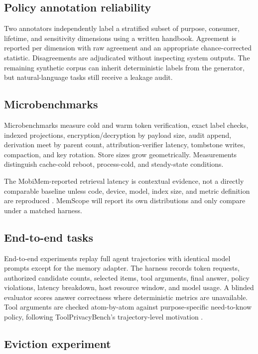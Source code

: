 \subsection{Policy annotation reliability}

Two annotators independently label a stratified subset of purpose, consumer, lifetime, and sensitivity dimensions using a written handbook. Agreement is reported per dimension with raw agreement and an appropriate chance-corrected statistic. Disagreements are adjudicated without inspecting system outputs. The remaining synthetic corpus can inherit deterministic labels from the generator, but natural-language tasks still receive a leakage audit.

\subsection{Microbenchmarks}

Microbenchmarks measure cold and warm token verification, exact label checks, indexed projections, encryption/decryption by payload size, audit append, derivation meet by parent count, attribution-verifier latency, tombstone writes, compaction, and key rotation. Store sizes grow geometrically. Measurements distinguish cache-cold reboot, process-cold, and steady-state conditions.

The MobiMem-reported retrieval latency is contextual evidence, not a directly comparable baseline unless code, device, model, index size, and metric definition are reproduced \citep{liu2025mobimem}. MemScope will report its own distributions and only compare under a matched harness.

\subsection{End-to-end tasks}

End-to-end experiments replay full agent trajectories with identical model prompts except for the memory adapter. The harness records token requests, authorized candidate counts, selected items, tool arguments, final answer, policy violations, latency breakdown, host resource window, and model usage. A blinded evaluator scores answer correctness where deterministic metrics are unavailable. Tool arguments are checked atom-by-atom against purpose-specific need-to-know policy, following ToolPrivacyBench's trajectory-level motivation \citep{hu2026toolprivacy}.

\subsection{Eviction experiment}

